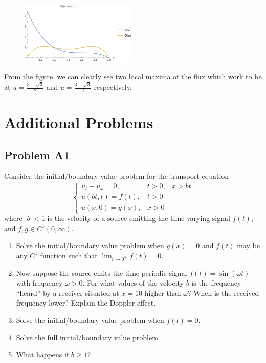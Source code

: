 \documentclass[a4paper,12pt]{article}
\newcommand{\abs}[1]{\left| #1 \right|}
\begin{document}
\begin{enumerate}[label = \textbf{(\alph*)}]
        \begin{figure}[h!]
            \centering
            \includegraphics[width = 0.5\textwidth]{images/two_humps.png}
        \end{figure}
    
        From the figure, we can clearly see two local maxima of the flux which work to be at $ u = \frac{3 - \sqrt{3}}{2} $ and $ u = \frac{3 + \sqrt{3}}{2} $ respectively.
	\end{enumerate}

\section*{Additional Problems}
\subsection*{Problem A1}
    Consider the initial/boundary value problem for the transport equation
    \[
        \left\{\begin{array}{lll}
            u_t + u_x = 0, & t > 0, & x > bt \\
            u(bt, t) = f(t), & t > 0 \\
            u(x,0) = g(x), & x > 0
        \end{array}\right.
    \]
    where $ \abs{b} < 1$ is the velocity of a source emitting the time-varying signal $ f(t) $, and $ f, g \in C^1(0, \infty) $.
    \begin{enumerate}[label = \textbf{(\alph*)}]
        \item Solve the initial/boundary value problem when $ g(x) = 0 $ and $ f(t) $ may be any $ C^1 $ function such that $ \lim_{t \to 0^+} f(t) = 0 $.
        
        \item Now suppose the source emits the time-periodic signal $ f(t) = \sin(\omega t) $ with frequency $ \omega > 0 $. For what values of the velocity $ b $ is the frequency ``heard'' by a receiver situated at $ x = 10 $ higher than $ \omega $? When is the received frequency lower? Explain the Doppler effect.
        
        \item Solve the initial/boundary value problem when $ f(t) = 0 $.
        
        \item Solve the full initial/boundary value problem.
        
        \item What happens if $ b \geq 1 $?
    \end{enumerate}
\end{document}
